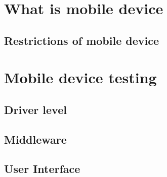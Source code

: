 


\section{What is mobile device}
\subsection{Restrictions of mobile device}
\section{Mobile device testing}
\subsection{Driver level}
\subsection{Middleware}
\subsection{User Interface}
\subsection{}



